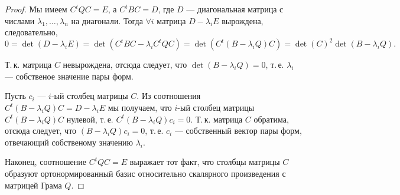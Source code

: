 \begin{proof}
    Мы имеем $C^tQC = E$, а $C^tBC = D$, где $D$ --- диагональная матрица с числами $\lambda_1, \ldots, \lambda_n$ на диагонали. Тогда $\forall i$ матрица $D - \lambda_iE$ вырождена, следовательно,
    \[
        0 = \det(D - \lambda_iE) = \det(C^tBC - \lambda_iC^tQC) = \det(C^t(B - \lambda_iQ)C) = \det(C)^2\det(B - \lambda_iQ).
    \]

    Т.\,к. матрица $C$ невырождена, отсюда следует, что $\det(B - \lambda_iQ) = 0$, т.\,е. $\lambda_i$ --- собственое значение пары форм.

    Пусть $c_i$ --- $i$-ый столбец матрицы $C$. Из соотношения $C^t(B - \lambda_iQ)C = D - \lambda_iE$ мы получаем, что $i$-ый столбец матрицы $C^t(B - \lambda_iQ)C$ нулевой, т.\,е. $C^t(B - \lambda_iQ)c_i = 0$. Т.\,к. матрица $C$ обратима, отсюда следует, что $(B - \lambda_iQ)c_i = 0$, т.\,е. $c_i$ --- собственный вектор пары форм, отвечающий собственому значению $\lambda_i$.

    Наконец, соотношение $C^tQC = E$ выражает тот факт, что столбцы матрицы $C$ образуют ортонормированный базис относительно скалярного произведения с матрицей Грама $Q$.
\end{proof}

